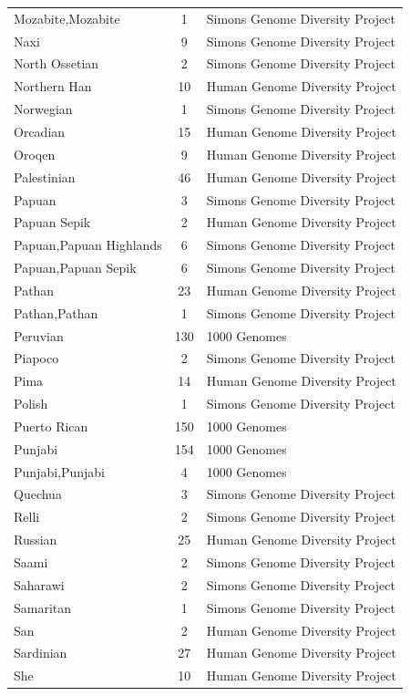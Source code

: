 \begin{longtable}[t]{lcl}
Mozabite,Mozabite & 1 & Simons Genome Diversity Project\\
Naxi & 9 & Simons Genome Diversity Project\\
North Ossetian & 2 & Simons Genome Diversity Project\\
Northern Han & 10 & Human Genome Diversity Project\\
Norwegian & 1 & Simons Genome Diversity Project\\
Orcadian & 15 & Human Genome Diversity Project\\
Oroqen & 9 & Human Genome Diversity Project\\
Palestinian & 46 & Human Genome Diversity Project\\
Papuan & 3 & Simons Genome Diversity Project\\
Papuan Sepik & 2 & Human Genome Diversity Project\\
Papuan,Papuan Highlands & 6 & Simons Genome Diversity Project\\
Papuan,Papuan Sepik & 6 & Simons Genome Diversity Project\\
Pathan & 23 & Human Genome Diversity Project\\
Pathan,Pathan & 1 & Simons Genome Diversity Project\\
Peruvian & 130 & 1000 Genomes\\
Piapoco & 2 & Simons Genome Diversity Project\\
Pima & 14 & Human Genome Diversity Project\\
Polish & 1 & Simons Genome Diversity Project\\
Puerto Rican & 150 & 1000 Genomes\\
Punjabi & 154 & 1000 Genomes\\
Punjabi,Punjabi & 4 & 1000 Genomes\\
Quechua & 3 & Simons Genome Diversity Project\\
Relli & 2 & Simons Genome Diversity Project\\
Russian & 25 & Human Genome Diversity Project\\
Saami & 2 & Simons Genome Diversity Project\\
Saharawi & 2 & Simons Genome Diversity Project\\
Samaritan & 1 & Simons Genome Diversity Project\\
San & 2 & Human Genome Diversity Project\\
Sardinian & 27 & Human Genome Diversity Project\\
She & 10 & Human Genome Diversity Project\\

\end{longtable}
